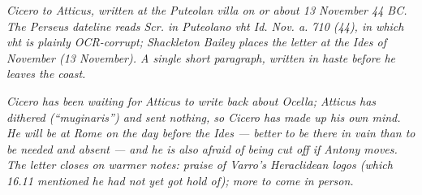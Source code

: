 
\textit{Cicero to Atticus, written at the Puteolan villa on
or about 13 November 44 BC. The Perseus dateline reads
\textit{Scr. in Puteolano vht Id. Nov. a. 710 (44)}, in which
\textit{vht} is plainly OCR-corrupt; Shackleton Bailey
places the letter at the Ides of November (13 November). A
single short paragraph, written in haste before he leaves
the coast.}

\textit{Cicero has been waiting for Atticus to write back
about Ocella; Atticus has dithered (``\textit{muginaris}'')
and sent nothing, so Cicero has made up his own mind. He
will be at Rome on the day before the Ides --- better to be
there in vain than to be needed and absent --- and he is
also afraid of being cut off if Antony moves. The letter
closes on warmer notes: praise of Varro's Heraclidean
\textit{logos} (which 16.11 mentioned he had not yet got
hold of); more to come in person.}
